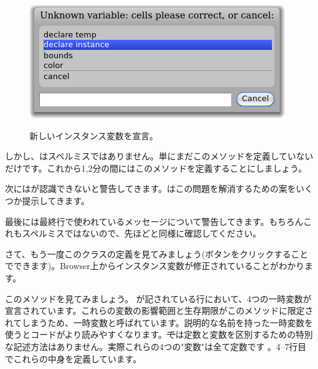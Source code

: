 \documentclass[a4paper,10pt,twoside]{book}
\begin{document}
\begin{figure}[htb]
\begin{minipage}{0.48\textwidth}
		{\includegraphics[scale=0.7]{DeclareInstanceVar}}
	\caption{新しいインスタンス変数を宣言。}
\end{minipage}
\end{figure}

しかし、はスペルミスではありません。単にまだこのメソッドを定義していないだけです。これから1,2分の間にはこのメソッドを定義することにしましょう。


次に\pharo はが認識できないと警告してきます。\pharo はこの問題を解消するための案をいくつか提示してきます。


最後に\pharo は最終行で使われているメッセージについて警告してきます。もちろんこれもスペルミスではないので、先ほどと同様に確認してください。


さて、もう一度このクラスの定義を見てみましょう(ボタンをクリックすることでできます)。Browser上からインスタンス変数が修正されていることがわかります。

このメソッドを見てみましょう。
が記されている行において、4つの一時変数が宣言されています。これらの変数の影響範囲と生存期限がこのメソッドに限定されてしまうため、一時変数と呼ばれています。説明的な名前を持った一時変数を使うとコードがより読みやすくなります。\st では定数と変数を区別するための特別な記述方法はありません。実際これらの4つの"変数"は全て定数です
。4--7行目でこれらの中身を定義しています。
\end{document}
